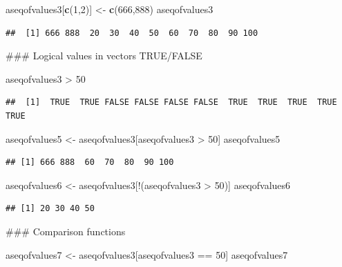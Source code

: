 \documentclass[]{book}
\newenvironment{Shaded}{\begin{snugshade}}{\end{snugshade}}
\newcommand{\KeywordTok}[1]{\textcolor[rgb]{0.13,0.29,0.53}{\textbf{{#1}}}}
\newcommand{\DecValTok}[1]{\textcolor[rgb]{0.00,0.00,0.81}{{#1}}}
\newcommand{\StringTok}[1]{\textcolor[rgb]{0.31,0.60,0.02}{{#1}}}
\newcommand{\NormalTok}[1]{{#1}}
\begin{document}
\begin{Shaded}
\begin{Highlighting}[]
\NormalTok{aseqofvalues3[}\KeywordTok{c}\NormalTok{(}\DecValTok{1}\NormalTok{,}\DecValTok{2}\NormalTok{)] <-}\StringTok{ }\KeywordTok{c}\NormalTok{(}\DecValTok{666}\NormalTok{,}\DecValTok{888}\NormalTok{)}
\NormalTok{aseqofvalues3}
\end{Highlighting}
\end{Shaded}

\begin{verbatim}
##  [1] 666 888  20  30  40  50  60  70  80  90 100
\end{verbatim}

\begin{Shaded}
\begin{Highlighting}[]
\NormalTok{### Logical values in vectors TRUE/FALSE}

\NormalTok{aseqofvalues3 >}\StringTok{ }\DecValTok{50}
\end{Highlighting}
\end{Shaded}

\begin{verbatim}
##  [1]  TRUE  TRUE FALSE FALSE FALSE FALSE  TRUE  TRUE  TRUE  TRUE  TRUE
\end{verbatim}

\begin{Shaded}
\begin{Highlighting}[]
\NormalTok{aseqofvalues5 <-}\StringTok{ }\NormalTok{aseqofvalues3[aseqofvalues3 >}\StringTok{ }\DecValTok{50}\NormalTok{]}
\NormalTok{aseqofvalues5}
\end{Highlighting}
\end{Shaded}

\begin{verbatim}
## [1] 666 888  60  70  80  90 100
\end{verbatim}

\begin{Shaded}
\begin{Highlighting}[]
\NormalTok{aseqofvalues6 <-}\StringTok{ }\NormalTok{aseqofvalues3[!(aseqofvalues3 >}\StringTok{ }\DecValTok{50}\NormalTok{)]}
\NormalTok{aseqofvalues6}
\end{Highlighting}
\end{Shaded}

\begin{verbatim}
## [1] 20 30 40 50
\end{verbatim}

\begin{Shaded}
\begin{Highlighting}[]
\NormalTok{### Comparison functions}

\NormalTok{aseqofvalues7 <-}\StringTok{ }\NormalTok{aseqofvalues3[aseqofvalues3 ==}\StringTok{ }\DecValTok{50}\NormalTok{]}
\NormalTok{aseqofvalues7}
\end{Highlighting}
\end{Shaded}
\end{document}
